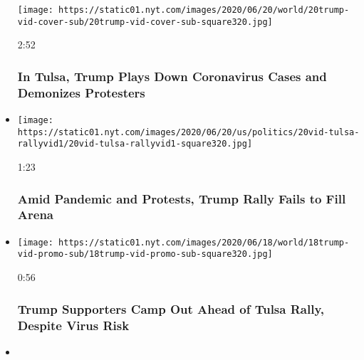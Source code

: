 \begin{itemize}
  \texttt{[image: https://static01.nyt.com/images/2020/06/20/world/20trump-vid-cover-sub/20trump-vid-cover-sub-square320.jpg]}

  2:52

  \hypertarget{in-tulsa-trump-plays-down-coronavirus-cases-and-demonizes-protesters}{%
  \subsubsection{In Tulsa, Trump Plays Down Coronavirus Cases and
  Demonizes
  Protesters}\label{in-tulsa-trump-plays-down-coronavirus-cases-and-demonizes-protesters}}
\item
  \href{https://www.nytimes.com/video/us/politics/100000007201990/trump-supporters-gather-in-tulsa-for-rally.html?action=click\&module=video-series-bar\&region=header\&pgtype=Article\&playlistId=video/2020-Elections}{}

  \texttt{[image: https://static01.nyt.com/images/2020/06/20/us/politics/20vid-tulsa-rallyvid1/20vid-tulsa-rallyvid1-square320.jpg]}

  1:23

  \hypertarget{amid-pandemic-and-protests-trump-rally-fails-to-fill-arena}{%
  \subsubsection{Amid Pandemic and Protests, Trump Rally Fails to Fill
  Arena}\label{amid-pandemic-and-protests-trump-rally-fails-to-fill-arena}}
\item
  \href{https://www.nytimes.com/video/us/politics/100000007199618/trump-tulsa-rally-supporters-coronavirus.html?action=click\&module=video-series-bar\&region=header\&pgtype=Article\&playlistId=video/2020-Elections}{}

  \texttt{[image: https://static01.nyt.com/images/2020/06/18/world/18trump-vid-promo-sub/18trump-vid-promo-sub-square320.jpg]}

  0:56

  \hypertarget{trump-supporters-camp-out-ahead-of-tulsa-rally-despite-virus-risk}{%
  \subsubsection{Trump Supporters Camp Out Ahead of Tulsa Rally, Despite
  Virus
  Risk}\label{trump-supporters-camp-out-ahead-of-tulsa-rally-despite-virus-risk}}
\item
  \href{https://www.nytimes.com/video/us/100000007186817/biden-criticizes-trumps-reopening-of-the-economy-as-a-one-point-plan.html?action=click\&module=video-series-bar\&region=header\&pgtype=Article\&playlistId=video/2020-Elections}{}


\end{itemize}
